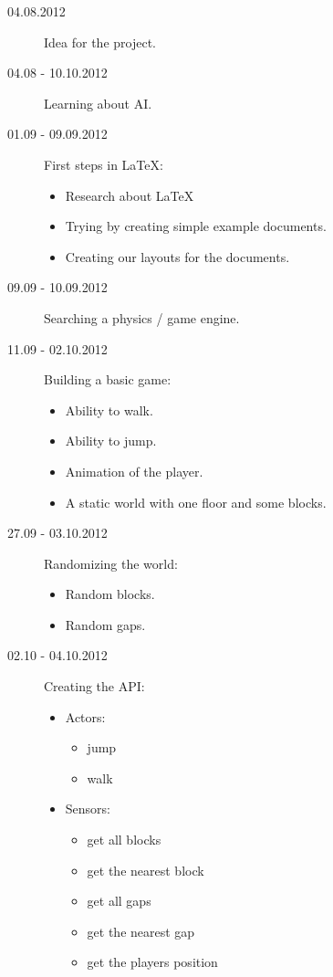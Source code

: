 \begin{description}
  \item[04.08.2012] Idea for the project.
  \item[04.08 - 10.10.2012] Learning about AI.
  \item[01.09 - 09.09.2012] First steps in \LaTeX:
    \begin{itemize}
      \item Research about \LaTeX
      \item Trying by creating simple example documents.
      \item Creating our layouts for the documents. 
    \end{itemize}
  \item[09.09 - 10.09.2012] Searching a physics / game engine.
  \item[11.09 - 02.10.2012] Building a basic game:
    \begin{itemize}
      \item Ability to walk.
      \item Ability to jump.
      \item Animation of the player.
      \item A static world with one floor and some blocks.
    \end{itemize}
  \item[27.09 - 03.10.2012] Randomizing the world:
    \begin{itemize}
      \item Random blocks.
      \item Random gaps.
    \end{itemize}
    \newpage
  \item[02.10 - 04.10.2012] Creating the API:
    \begin{itemize}
      \item Actors:
        \begin{itemize}
          \item jump
          \item walk
        \end{itemize}
      \item Sensors:
        \begin{itemize}
          \item get all blocks
          \item get the nearest block
          \item get all gaps
          \item get the nearest gap
          \item get the players position

\end{itemize}
\end{itemize}
\end{description}

